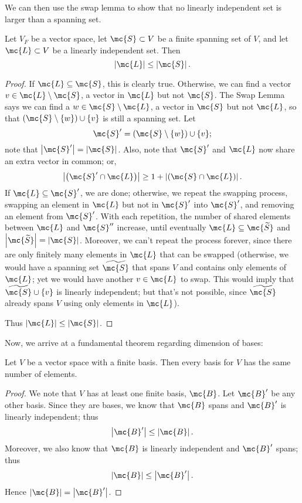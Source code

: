 \documentclass[math1530-lecture-notes]{subfiles}
\begin{document}
We can then use the swap lemma to show that no linearly independent set is larger than a spanning
set.
\begin{lemma}[]{}
  Let $V_F$ be a vector space, let $\mc{S}\subset V$ be a finite spanning set of $V$, and let
  $\mc{L}\subset V$ be a linearly independent set. Then \[
    \left| \mc{L} \right| \le \left| \mc{S} \right| 
  .\] 
\end{lemma}
\begin{proof}[Proof]
  If $\mc{L}\subseteq \mc{S}$, this is clearly true. Otherwise, we can find a vector $v\in
  \mc{L}\setminus \mc{S}$, a vector in $\mc{L}$ but not $\mc{S}$. The Swap Lemma says we can find a
  $w\in \mc{S}\setminus \mc{L}$, a vector in $\mc{S}$ but not $\mc{L}$, so that $\left(
  \mc{S}\setminus \{ w \} \right) \cup \{ v \}$ is still a spanning set. Let \[
    \mc{S}' = \left( \mc{S}\setminus \{ w \} \right) \cup \{ v \}
  ;\] note that $\left| \mc{S}' \right| =\left| \mc{S} \right| $. Also, note that $\mc{S}'$ and
  $\mc{L}$ now share an extra vector in common; or, \[
    \left| \left( \mc{S}'\cap \mc{L} \right)  \right| \ge 1+\left| \left( \mc{S}\cap \mc{L} \right)  \right|  
  .\] If $\mc{L}\subseteq \mc{S}'$, we are done; otherwise, we repeat the swapping process, swapping
  an element in $\mc{L}$ but not in $\mc{S}'$ into $\mc{S}'$, and removing an element from
  $\mc{S}'$. With each repetition, the number of shared elements between $\mc{L}$ and $\mc{S}''$
  increase, until eventually $\mc{L}\subseteq \mc{\widetilde{S}}$ and $\left| \mc{\widetilde{S}}
  \right| =\left| \mc{S} \right| $. Moreover, we can't repeat the process forever, since there are
  only finitely many elements in $\mc{L}$ that can be swapped (otherwise, we would have a spanning
  set $\widetilde{\mc{S}}$ that spans $V$ and contains only elements of $\mc{L}$; yet we would have
  another $v\in \mc{L}$ to swap. This would imply that $\widetilde{\mc{S}}\cup \{ v \}$ is linearly
  independent; but that's not possible, since $\widetilde{\mc{S}}$ already spans $V$ using only
  elements in $\mc{L}$).

  Thus $\left| \mc{L} \right| \le \left| \mc{S} \right| $.
\end{proof}

Now, we arrive at a fundamental theorem regarding dimension of bases:
\begin{theorem}{}
  Let $V$ be a vector space with a finite basis. Then every basis for $V$ has the same number of
  elements.
\end{theorem}
\begin{proof}[Proof]
  We note that $V$ has at least one finite basis, $\mc{B}$. Let $\mc{B}'$ be any other basis. Since
  they are bases, we know that $\mc{B}$ spans and $\mc{B}'$ is linearly independent; thus \[
    \left| \mc{B}' \right| \le \left| \mc{B} \right| 
  .\] Moreover, we also know that $\mc{B}$ is linearly independent and $\mc{B}'$ spans; thus \[
  \left| \mc{B} \right| \le \left| \mc{B}' \right| 
.\] Hence $\left| \mc{B} \right| =\left| \mc{B}' \right| $.
\end{proof}
\end{document}
